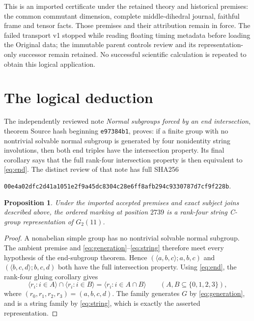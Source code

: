 \documentclass[11pt]{article}
\newtheorem{proposition}{Proposition}
\newcommand{\gen}[1]{\langle #1\rangle}
\begin{document}
This is an imported certificate under the retained theory and historical
premises: the common commutant dimension, complete middle-dihedral
journal, faithful frame and tensor facts.  Those premises and their
attribution remain in force.  The failed transport v1 stopped while
reading floating timing metadata before loading the Original data;
the immutable parent controls review and its representation-only
successor remain retained.  No successful scientific calculation is
repeated to obtain this logical application.

\section*{The logical deduction}

The independently reviewed note \emph{Normal subgroups forced by an end
intersection}, theorem Source hash beginning \texttt{e97384b1}, proves:
if a finite group with no nontrivial solvable normal subgroup is
generated by four nonidentity string involutions, then both end
triples have the intersection property.  Its final corollary says that
the full rank-four intersection property is then equivalent to
\eqref{eq:end}.  The distinct review of that note has full SHA256
\begin{center}\small\texttt{00e4a02dfc2d41a1051e2f9a45dc8304c28e6ff8afb294c9330787d7cf9f228b}.\end{center}

\begin{proposition}
Under the imported accepted premises and exact subject joins described
above, the ordered marking at position $2739$ is a rank-four string
C-group representation of $G_2(11)$.
\end{proposition}
\begin{proof}
A nonabelian simple group has no nontrivial solvable normal subgroup.
The ambient premise and \eqref{eq:generation}--\eqref{eq:string} therefore
meet every hypothesis of the end-subgroup theorem.  Hence
$(\gen{a,b,c};a,b,c)$ and $(\gen{b,c,d};b,c,d)$ both have the full
intersection property.  Using \eqref{eq:end}, the rank-four gluing
corollary gives
\[
 \gen{r_i:i\in A}\cap\gen{r_i:i\in B}
              =\gen{r_i:i\in A\cap B}
              \qquad(A,B\subseteq\{0,1,2,3\}),
\]
where $(r_0,r_1,r_2,r_3)=(a,b,c,d)$.  The family generates $G$ by
\eqref{eq:generation}, and is a string family by \eqref{eq:string},
which is exactly the asserted representation.
\end{proof}
\end{document}
